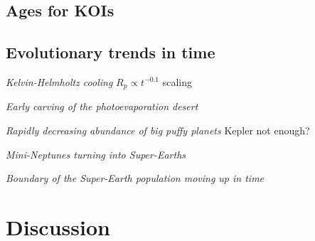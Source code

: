 \documentclass[11pt,twocolumn,tighten]{aastex63}
\begin{document}

%


\subsection{Ages for KOIs}

\subsection{Evolutionary trends in time}

{\it Kelvin-Helmholtz cooling}
$R_p \propto t^{-0.1}$ scaling \citep{Gupta_2019}

{\it Early carving of the photoevaporation desert}
\citep{Owen_Lai_2018}

{\it Rapidly decreasing abundance of big puffy planets}
Kepler not enough?

{\it Mini-Neptunes turning into Super-Earths}
\citep[e.g.][]{Rogers_2021}

{\it Boundary of the Super-Earth population moving up in time}
\citep{David_2021}


\section{Discussion}
\label{sec:disc}
\end{document}
